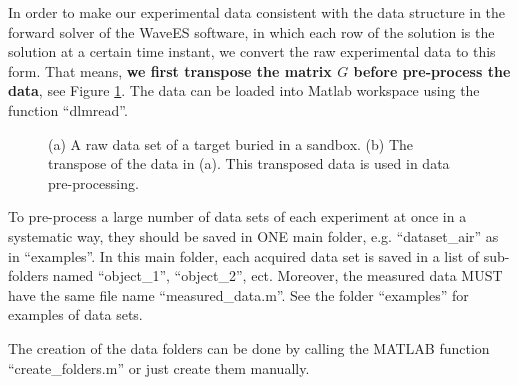 \documentclass[a4paper,12pt]{article}
\begin{document}
In order to make our experimental data consistent with the data structure in the forward solver of the WaveES software, in which each row of the solution is the solution at a certain time instant, we convert the raw experimental data to this form. That means, \textbf{we first transpose the matrix $G$ before pre-process the data}, see  Figure \ref{fig1}. The data can be loaded into Matlab workspace using the function ``dlmread''. 
\begin{figure}[tph]
   \centering
  \caption{(a) A raw data set of a target buried in a sandbox. (b) The transpose of the data in (a). This transposed data is used in data pre-processing.} 
  \label{fig1}
\end{figure}

To pre-process a large number of data sets of each experiment at once in a systematic way, they should be saved in ONE main folder, e.g. ``dataset\_air'' as in ``examples''.  In this main folder, each acquired data set is saved in a list of sub-folders named ``object\_1'', ``object\_2'', ect. Moreover, the measured data MUST have the same file name ``measured\_data.m''. See the folder ``examples'' for examples of data sets. 

The creation of the data folders can be done by calling the MATLAB function ``create\_folders.m'' or just create them manually. 
\end{document}
